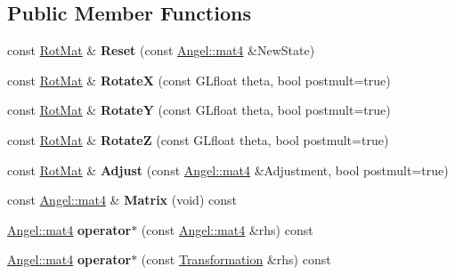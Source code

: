 \subsection*{Public Member Functions}
\begin{DoxyCompactItemize}
\item 
\hypertarget{class_rot_mat_abe1e5d870c095d4345d58d5539a3f86a}{const \hyperlink{class_rot_mat}{Rot\-Mat} \& {\bfseries Reset} (const \hyperlink{class_angel_1_1mat4}{Angel\-::mat4} \&New\-State)}\label{class_rot_mat_abe1e5d870c095d4345d58d5539a3f86a}

\item 
\hypertarget{class_rot_mat_ad4def0c34e58da1bd9b3a39f6a9fce91}{const \hyperlink{class_rot_mat}{Rot\-Mat} \& {\bfseries Rotate\-X} (const G\-Lfloat theta, bool postmult=true)}\label{class_rot_mat_ad4def0c34e58da1bd9b3a39f6a9fce91}

\item 
\hypertarget{class_rot_mat_a6823dc0196574a21bddfd166024204f5}{const \hyperlink{class_rot_mat}{Rot\-Mat} \& {\bfseries Rotate\-Y} (const G\-Lfloat theta, bool postmult=true)}\label{class_rot_mat_a6823dc0196574a21bddfd166024204f5}

\item 
\hypertarget{class_rot_mat_a8f93106da83a30fb56482859a39ed2a4}{const \hyperlink{class_rot_mat}{Rot\-Mat} \& {\bfseries Rotate\-Z} (const G\-Lfloat theta, bool postmult=true)}\label{class_rot_mat_a8f93106da83a30fb56482859a39ed2a4}

\item 
\hypertarget{class_rot_mat_af5ba2e61406934af90e612a037659fb0}{const \hyperlink{class_rot_mat}{Rot\-Mat} \& {\bfseries Adjust} (const \hyperlink{class_angel_1_1mat4}{Angel\-::mat4} \&Adjustment, bool postmult=true)}\label{class_rot_mat_af5ba2e61406934af90e612a037659fb0}

\item 
\hypertarget{class_transformation_ae6a57a1ee74ca1da1b8aef3d328a8772}{const \hyperlink{class_angel_1_1mat4}{Angel\-::mat4} \& {\bfseries Matrix} (void) const }\label{class_transformation_ae6a57a1ee74ca1da1b8aef3d328a8772}

\item 
\hypertarget{class_transformation_afdfbf48815a5b0d885f3b93f04cd2c66}{\hyperlink{class_angel_1_1mat4}{Angel\-::mat4} {\bfseries operator$\ast$} (const \hyperlink{class_angel_1_1mat4}{Angel\-::mat4} \&rhs) const }\label{class_transformation_afdfbf48815a5b0d885f3b93f04cd2c66}

\item 
\hypertarget{class_transformation_a85b923e0066365ef2e4aec3671396410}{\hyperlink{class_angel_1_1mat4}{Angel\-::mat4} {\bfseries operator$\ast$} (const \hyperlink{class_transformation}{Transformation} \&rhs) const }\label{class_transformation_a85b923e0066365ef2e4aec3671396410}

\end{DoxyCompactItemize}
